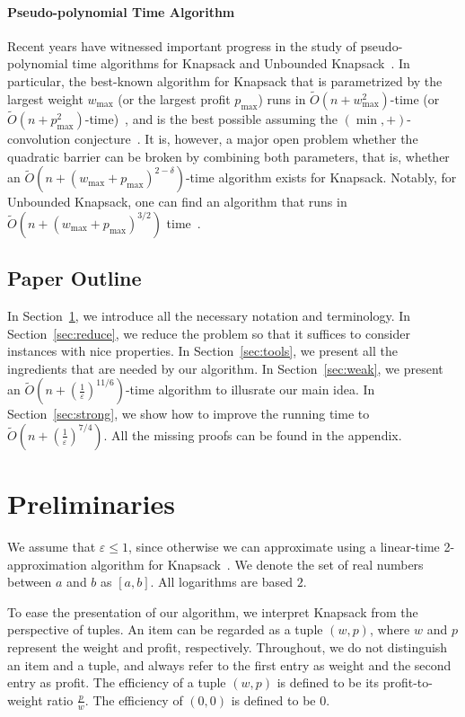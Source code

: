 \documentclass[a4paper,UKenglish,cleveref, autoref, thm-restate, pdfa]{lipics-v2021}
\newcommand{\eps}{\varepsilon}
\renewcommand{\leq}{\leqslant}
\begin{document}
\paragraph*{Pseudo-polynomial Time Algorithm}
Recent years have witnessed important progress in the study of pseudo-polynomial time algorithms for Knapsack and Unbounded Knapsack~\cite{BC22,BC23,CLMZ24aSODA,Bri24,Jin24}. In particular, the best-known algorithm for Knapsack that is parametrized by the largest weight $w_{\max}$ (or the largest profit $p_{\max}$) runs in $\tilde{O}(n+w_{\max}^2)$-time (or $\tilde{O}(n+p_{\max}^2)$-time)~\cite{Bri24,Jin24}, and is the best possible assuming the $(\min, +)$-convolution conjecture~\cite{CMWW19, KPS17}. It is, however, a major open problem whether the quadratic barrier can be broken by combining both parameters, that is, whether an $\tilde{O}(n+{(w_{\max}+p_{\max})}^{2-\delta})$-time algorithm exists for Knapsack. Notably, for Unbounded Knapsack, one can find an algorithm that runs in $\tilde{O}(n+{(w_{\max}+p_{\max})}^{3/2})$ time~\cite{BC22}.

\subsection{Paper Outline}
In Section~\ref{sec:pre}, we introduce all the necessary notation and terminology. In Section~\ref{sec:reduce}, we reduce the problem so that it suffices to consider instances with nice properties. In Section~\ref{sec:tools}, we present all the ingredients that are needed by our algorithm. In Section~\ref{sec:weak}, we present an $\tilde{O}(n + (\frac{1}{\eps})^{11/6})$-time algorithm to illusrate our main idea. In Section~\ref{sec:strong}, we show how to improve the running time to $\tilde{O}(n + (\frac{1}{\eps})^{7/4})$. All the missing proofs can be found in the appendix.

\section{Preliminaries}\label{sec:pre}
We assume that $\eps \leq 1$, since otherwise we can approximate using a linear-time 2-approximation algorithm for Knapsack~\cite[Section 2.5]{KPD04}. We denote the set of real numbers between $a$ and $b$ as $[a, b]$. All logarithms are based $2$.

To ease the presentation of our algorithm, we interpret Knapsack from the perspective of tuples. An item can be regarded as a tuple $(w,p)$, where $w$ and $p$ represent the weight and profit, respectively. Throughout, we do not distinguish an item and a tuple, and always refer to the first entry as weight and the second entry as profit.  The efficiency of a tuple $(w, p)$ is defined to be its profit-to-weight ratio $\frac{p}{w}$.  The efficiency of $(0,0)$ is defined to be $0$.
\end{document}
